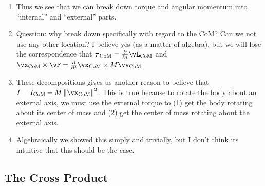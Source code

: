 \begin{enumerate}
  \item Thus we see that we can break down torque and angular momentum
  into ``internal'' and ``external'' parts.

  \item Question: why break down specifically with regard to the CoM?
  Can we not use any other location? I believe yes (as a matter of
  algebra), but we will lose the correspondence that $\vtau_\CoM =
  \fpartial{t} \vL_\CoM$ and $\vx_\CoM \cross \vF = \fpartial{t}
  \vx_\CoM \cross M \vv_\CoM$.

  \item These decompositions gives us another reason to believe that $I
  = I_\CoM + M \normsq{\vx_\CoM}$. This is true because to rotate the
  body about an external axis, we must use the external torque to (1)
  get the body rotating about its center of mass and (2) get the center
  of mass rotating about the external axis.

  \item {} Algebraically we showed this simply and trivially, but
  I don't think its intuitive that this should be the case.
\end{enumerate}

\subsection{The Cross Product}

